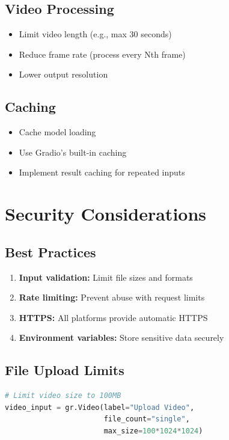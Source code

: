 \documentclass[11pt,a4paper]{article}
\begin{document}
\subsection{Video Processing}
\begin{itemize}
    \item Limit video length (e.g., max 30 seconds)
    \item Reduce frame rate (process every Nth frame)
    \item Lower output resolution
\end{itemize}

\subsection{Caching}
\begin{itemize}
    \item Cache model loading
    \item Use Gradio's built-in caching
    \item Implement result caching for repeated inputs
\end{itemize}

\section{Security Considerations}

\subsection{Best Practices}
\begin{enumerate}
    \item \textbf{Input validation:} Limit file sizes and formats
    \item \textbf{Rate limiting:} Prevent abuse with request limits
    \item \textbf{HTTPS:} All platforms provide automatic HTTPS
    \item \textbf{Environment variables:} Store sensitive data securely
\end{enumerate}

\subsection{File Upload Limits}
\begin{lstlisting}[language=Python]
# Limit video size to 100MB
video_input = gr.Video(label="Upload Video", 
                       file_count="single",
                       max_size=100*1024*1024)
\end{lstlisting}
\end{document}
